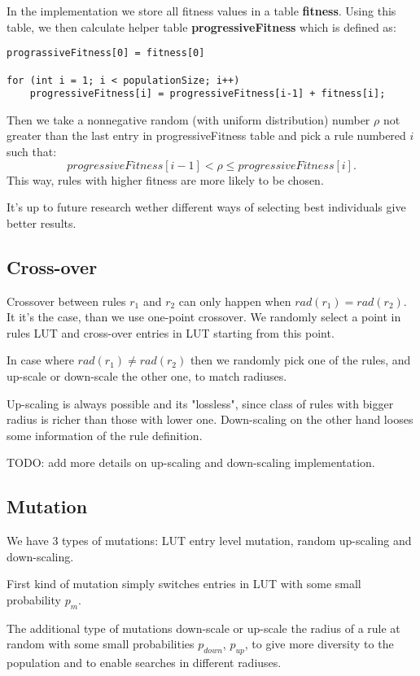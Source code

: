 \documentclass[12pt,a4paper]{article}
\begin{document}
In the implementation we store all fitness values in a table {\bf fitness}. Using this table, we then calculate helper table {\bf progressiveFitness} which is defined as:
\begin{verbatim}
prograssiveFitness[0] = fitness[0]

for (int i = 1; i < populationSize; i++)
	progressiveFitness[i] = progressiveFitness[i-1] + fitness[i];
\end{verbatim}

Then we take a nonnegative random (with uniform distribution) number $\rho$ not greater than the last entry in progressiveFitness table and pick a rule numbered $i$ such that:
\[ progressiveFitness[i-1] < \rho \leq progressiveFitness[i].\]
This way, rules with higher fitness are more likely to be chosen.

It's up to future research wether different ways of selecting best individuals give better results. 


\subsection{Cross-over}

Crossover between rules $r_1$ and $r_2$ can only happen when $rad(r_1) = rad(r_2)$. It it's the case, than we use one-point crossover. We randomly select a point in rules LUT and cross-over entries in LUT starting from this point. 

In case where $rad(r_1)\neq rad(r_2)$ then we randomly pick one of the rules, and up-scale or down-scale the other one, to match radiuses.

Up-scaling is always possible and its "lossless", since class of rules with bigger radius is richer than those with lower one. Down-scaling on the other hand looses some information of the rule definition.

TODO: add more details on up-scaling and down-scaling implementation.

\subsection{Mutation}

We have 3 types of mutations: LUT entry level mutation, random up-scaling and down-scaling.

First kind of mutation simply switches entries in LUT with some small probability $p_m$.

The additional type of mutations down-scale or up-scale the radius of a rule at random with some small probabilities $p_{down}$, $p_{up}$, to give more diversity to the population and to enable searches in different radiuses.
\end{document}
